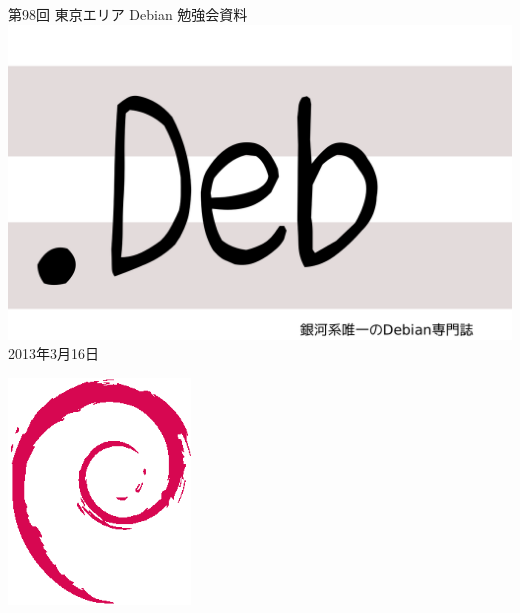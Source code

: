 \documentclass[mingoth,a4paper]{jsarticle}
\newcommand{\debmtgyear}{2013}
\newcommand{\debmtgmonth}{3}
\newcommand{\debmtgdate}{16}
\newcommand{\debmtgnumber}{98}
\begin{document}
\begin{titlepage}
\thispagestyle{empty}

\vspace*{-2cm}
第\debmtgnumber{}回 東京エリア Debian 勉強会資料\\
\hspace*{-2cm}
\includegraphics{image2012-natsu/dotdeb.pdf}\\
\hfill{}\debmtgyear{}年\debmtgmonth{}月\debmtgdate{}日



\vspace*{-2cm}
\hfill{}\includegraphics[height=6cm]{image200502/openlogo-nd.eps}
\end{titlepage}

\end{document}
